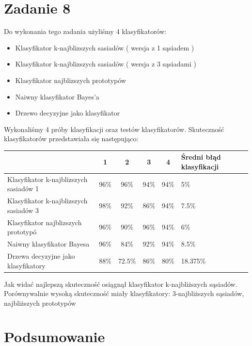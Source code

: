 \documentclass[a4paper,12pt,twoside]{article}
\begin{document}
\section{Zadanie 8}
Do wykonania tego zadania użyliśmy 4 klasyfikatorów:
\begin{itemize}
\item Klasyfikator k-najblizszych sasiadów ( wersja z 1 sąsiadem )
\item Klasyfikator k-najblizszych sasiadów ( wersja z 3 sąsiadami )
\item Klasyfikator najblizszych prototypów
\item Naiwny klasyfikator Bayes'a
\item Drzewo decyzyjne jako klasyfikator
\end{itemize}

Wykonaliśmy 4 próby klasyfikacji oraz testów klasyfikatorów. Skuteczność klasyfikatorów przedstawiała się następująco:

\begin{table}[h]
\begin{tabular}{|l|c|c|c|c|l|}
\hline
                                       & 1    & 2      & 3    & 4    & Średni błąd klasyfikacji \\ \hline
Klasyfikator k-najblizszych sasiadów 1 & 96\% & 96\%   & 94\% & 94\% & 5\%                      \\ \hline
Klasyfikator k-najblizszych sasiadów 3 & 98\% & 92\%   & 86\% & 94\% & 7.5\%                    \\ \hline
Klasyfikator najblizszych prototypó    & 96\% & 90\%   & 96\% & 94\% & 6\%                      \\ \hline
Naiwny klasyfikator Bayesa             & 96\% & 84\%   & 92\% & 94\% & 8.5\%                    \\ \hline
Drzewa decyzyjne jako klasyfikatory    & 88\% & 72.5\% & 86\% & 80\% & 18.375\%                 \\ \hline
\end{tabular}
\end{table}
Jak widać najlepszą skuteczność osiągnął klasyfikator k-najbliższych sąsiadów. Porównywalnie wysoką skuteczność miały klasyfikatory: 3-najbliższych sąsiadów, najbliższych prototypów
\section{Podsumowanie}
\bigskip


\end{document}
